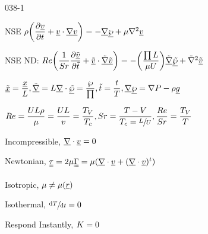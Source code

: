 \begin{mitframe}{038-1}
\begin{listone}
	\item NSE $\dens\bigg(\dfrac{\partial\uline{\vvel}}{\partial{t}}+\uline{\vvel}\cdot\uline{\nabla\vvel}\bigg)=-\gradop\uline{\dynpress}+\chempot\nabla^{2}\uline{\vvel}$
	\item NSE ND: $\reynolds\bigg(\dfrac{1}{\strouhal}\dfrac{\partial\uline{\tilde{\vvel}}}{\partial\tilde{t}}+\uline{\tilde{\vvel}}\cdot\uline{\tilde{\nabla}\tilde{\vvel}}\bigg)=-\bigg(\dfrac{\prod\length}{\chempot\uvel}\bigg)\tilde{\gradop}\uline{\tilde{\dynpress}}+\tilde{\nabla}^{2}\uline{\tilde{\vvel}}$
	\item$\uline{\tilde{\disp}}=\dfrac{\uline{\disp}}{\length},{\tilde{\gradop}}=\length\gradop\cdot\uline{\tilde{\dynpress}}=\dfrac{\dynpress}{\prod}, \tilde{t}=\dfrac{t}{\Temp},\gradop\uline{\dynpress}=\nabla\p-\dens\uline{\grav}$
	\item $\reynolds=\dfrac{\intenergy\length\dens}{\chempot}=\dfrac{\intenergy\length}{\vvel}=\dfrac{\Temp_{\vol}}{\Temp_{\lightspeed}}, \strouhal=\dfrac{\Temp-{\vol}}{\Temp_{\lightspeed}=\sfrac{\length}{\intenergy}},\dfrac{\reynolds}{\strouhal}=\dfrac{\Temp_{\vol}}{\Temp}$
				\begin{listtwo}
         	       \item Incompressible, $\gradop\cdot\uline\vvel=0$
                	\item Newtonian,  $\uuline{\torque}=2\chempot\straintens =\chempot(\gradop\cdot\uline{\vvel}+(\gradop\cdot\uline{\vvel})^{t})$
               	 \item Isotropic, $\chempot\neq\chempot(\uline{\pos})$
             	 \item Isothermal, $\sfrac{ \mathrm{d}\Temp}{\mathrm{d}t}=0$
              	 \item Respond Instantly, $\taylordisp=0$
			\end{listtwo}
\end{listone}
\end{mitframe}